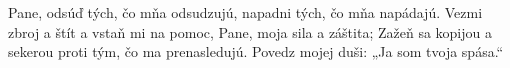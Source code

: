 Pane, odsúď tých, čo mňa odsudzujú,
napadni tých, čo mňa napádajú.
Vezmi zbroj a štít
a vstaň mi na pomoc, Pane, moja sila a záštita;
\versseparator
Zažeň sa kopijou a sekerou
proti tým, čo ma prenasledujú.
Povedz mojej duši: „Ja som tvoja spása.“